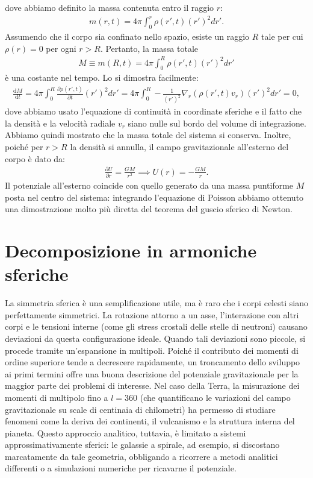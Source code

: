 dove abbiamo definito la massa contenuta entro il raggio $r$:
\begin{align}
	m(r, t) = 4 \pi \int_0^r \rho(r', t) (r')^2 dr'.
\end{align}
Assumendo che il corpo sia confinato nello spazio, esiste un raggio $R$ tale per cui $\rho(r) = 0$ per ogni $r > R$. Pertanto, la massa totale
\begin{align}
    M \equiv m(R, t) = 4 \pi \int_0^R \rho(r', t) (r')^2 dr'
\end{align}
è una costante nel tempo. Lo si dimostra facilmente:
\begin{align}
    \frac{\mathrm{d} M}{\mathrm{d}t} = 4 \pi \int_0^R \frac{\partial \rho(r', t)}{\partial t} (r')^2 dr' = 4 \pi \int_0^R -\frac{1}{(r')^2} \nabla_r (\rho(r', t) v_r)(r')^2 dr' = 0,
\end{align}
dove abbiamo usato l'equazione di continuità in coordinate sferiche e il fatto che la densità e la velocità radiale $v_r$ siano nulle sul bordo del volume di integrazione. 
Abbiamo quindi mostrato che la massa totale del sistema si conserva. Inoltre, poiché per $r > R$ la densità si annulla, il campo gravitazionale all'esterno del corpo è dato da:
\begin{align}
    \frac{\partial U}{\partial r} = \frac{G M}{r^2} \implies U(r) = -\frac{G M}{r}.
\end{align}
Il potenziale all'esterno coincide con quello generato da una massa puntiforme $M$ posta nel centro del sistema: integrando l'equazione di Poisson abbiamo ottenuto una dimostrazione molto più diretta del teorema del guscio sferico di Newton.

\section{Decomposizione in armoniche sferiche}
La simmetria sferica è una semplificazione utile, ma è raro che i corpi celesti siano perfettamente simmetrici. La rotazione attorno a un asse, l'interazione con altri corpi e le tensioni interne (come gli stress crostali delle stelle di neutroni) causano deviazioni da questa configurazione ideale. Quando tali deviazioni sono piccole, si procede tramite un'espansione in multipoli. Poiché il contributo dei momenti di ordine superiore tende a decrescere rapidamente, un troncamento dello sviluppo ai primi termini offre una buona descrizione del potenziale gravitazionale per la maggior parte dei problemi di interesse.
Nel caso della Terra, la misurazione dei momenti di multipolo fino a $l = 360$ (che quantificano le variazioni del campo gravitazionale su scale di centinaia di chilometri) ha permesso di studiare fenomeni come la deriva dei continenti, il vulcanismo e la struttura interna del pianeta. Questo approccio analitico, tuttavia, è limitato a sistemi approssimativamente sferici: le galassie a spirale, ad esempio, si discostano marcatamente da tale geometria, obbligando a ricorrere a metodi analitici differenti o a simulazioni numeriche per ricavarne il potenziale.


